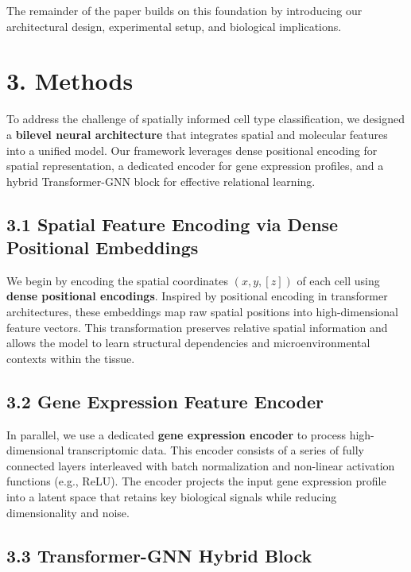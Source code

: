 \documentclass[unnumsec,webpdf,contemporary,medium]{oup-authoring-template}
\begin{document}
The remainder of the paper builds on this foundation by introducing our architectural design, experimental setup, and biological implications.


\section{3. Methods}

To address the challenge of spatially informed cell type classification, we designed a \textbf{bilevel neural architecture} that integrates spatial and molecular features into a unified model. Our framework leverages dense positional encoding for spatial representation, a dedicated encoder for gene expression profiles, and a hybrid Transformer-GNN block for effective relational learning.

\subsection{3.1 Spatial Feature Encoding via Dense Positional Embeddings}

We begin by encoding the spatial coordinates $(x, y, [z])$ of each cell using \textbf{dense positional encodings}. Inspired by positional encoding in transformer architectures, these embeddings map raw spatial positions into high-dimensional feature vectors. This transformation preserves relative spatial information and allows the model to learn structural dependencies and microenvironmental contexts within the tissue.

\subsection{3.2 Gene Expression Feature Encoder}

In parallel, we use a dedicated \textbf{gene expression encoder} to process high-dimensional transcriptomic data. This encoder consists of a series of fully connected layers interleaved with batch normalization and non-linear activation functions (e.g., ReLU). The encoder projects the input gene expression profile into a latent space that retains key biological signals while reducing dimensionality and noise.

\subsection{3.3 Transformer-GNN Hybrid Block}
\end{document}
